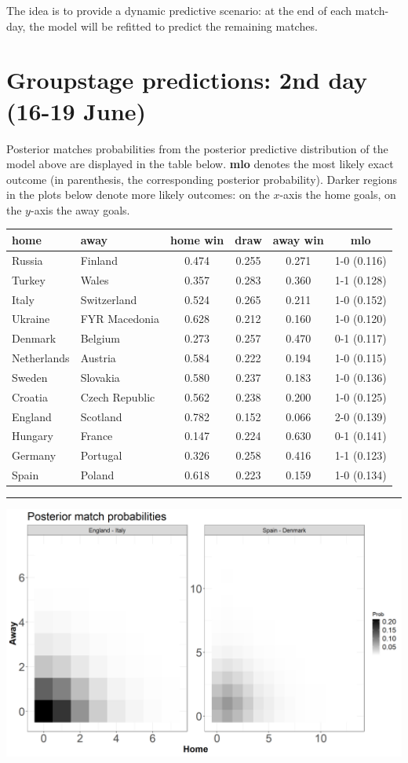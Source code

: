 \documentclass[
  10pt,
]{article}
\begin{document}
The idea is to provide a dynamic predictive scenario: at the end of each
match-day, the model will be refitted to predict the remaining matches.

\hypertarget{groupstage-predictions-2nd-day-16-19-june}{%
\section{Groupstage predictions: 2nd day (16-19
June)}\label{groupstage-predictions-2nd-day-16-19-june}}

Posterior matches probabilities from the posterior predictive
distribution of the model above are displayed in the table below.
\textbf{mlo} denotes the most likely exact outcome (in parenthesis, the
corresponding posterior probability). Darker regions in the plots below
denote more likely outcomes: on the \(x\)-axis the home goals, on the
\(y\)-axis the away goals.

\begin{longtable}[]{@{}llcccc@{}}
\toprule
home & away & home win & draw & away win & mlo\tabularnewline
\midrule
\endhead
Russia & Finland & 0.474 & 0.255 & 0.271 & 1-0 (0.116)\tabularnewline
Turkey & Wales & 0.357 & 0.283 & 0.360 & 1-1 (0.128)\tabularnewline
Italy & Switzerland & 0.524 & 0.265 & 0.211 & 1-0 (0.152)\tabularnewline
Ukraine & FYR Macedonia & 0.628 & 0.212 & 0.160 & 1-0
(0.120)\tabularnewline
Denmark & Belgium & 0.273 & 0.257 & 0.470 & 0-1 (0.117)\tabularnewline
Netherlands & Austria & 0.584 & 0.222 & 0.194 & 1-0
(0.115)\tabularnewline
Sweden & Slovakia & 0.580 & 0.237 & 0.183 & 1-0 (0.136)\tabularnewline
Croatia & Czech Republic & 0.562 & 0.238 & 0.200 & 1-0
(0.125)\tabularnewline
England & Scotland & 0.782 & 0.152 & 0.066 & 2-0 (0.139)\tabularnewline
Hungary & France & 0.147 & 0.224 & 0.630 & 0-1 (0.141)\tabularnewline
Germany & Portugal & 0.326 & 0.258 & 0.416 & 1-1 (0.123)\tabularnewline
Spain & Poland & 0.618 & 0.223 & 0.159 & 1-0 (0.134)\tabularnewline
\bottomrule
\end{longtable}

\begin{center}\rule{0.5\linewidth}{0.5pt}\end{center}

\begin{center}\includegraphics[width=0.8\linewidth]{figs/data2-1} \end{center}
\end{document}
